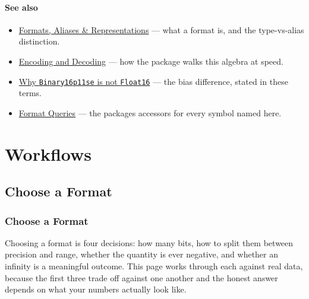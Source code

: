 \subsection{See also}



\label{292862844209942199-dup7}{}


\begin{itemize}
\item \href{concept\_\allowbreak{}format\_\allowbreak{}anatomy.md}{Formats, Aliases \& Representations} — what a format is, and the type-vs-alias distinction.


\item \href{internals\_\allowbreak{}encoding\_\allowbreak{}decoding.md}{Encoding and Decoding} — how the package walks this algebra at speed.


\item \href{workflow\_\allowbreak{}float16.md}{Why \texttt{Binary16p11se} is not \texttt{Float16}} — the bias difference, stated in these terms.


\item \href{reference\_\allowbreak{}formats\_\allowbreak{}values.md}{Format Queries} — the package{\textquotesingle}s accessors for every symbol named here.

\end{itemize}


\part{Workflows}


\chapter{Choose a Format}


\section{Choose a Format}



\label{4793595142642214899}{}


Choosing a format is four decisions: how many bits, how to split them between precision and range, whether the quantity is ever negative, and whether an infinity is a meaningful outcome. This page works through each against real data, because the first three trade off against one another and the honest answer depends on what your numbers actually look like.



